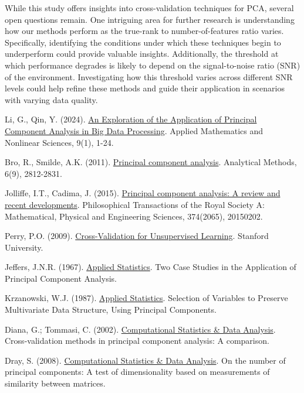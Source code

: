 \documentclass{article}
\begin{document}
While this study offers insights into cross-validation techniques for PCA, several open questions remain.
One intriguing area for further research is understanding how our methods perform as the true-rank to number-of-features ratio varies. 
Specifically, identifying the conditions under which these techniques begin to underperform could provide valuable insights. 
Additionally, the threshold at which performance degrades is likely to depend on the signal-to-noise ratio (SNR) of the environment. 
Investigating how this threshold varies across different SNR levels could help refine these methods and guide their application in scenarios with varying data quality.


\begin{thebibliography}{9}

   Li, G., Qin, Y. (2024).
   \href{https://doi.org/10.2478/amns-2024-0664}{An Exploration of the Application of Principal Component Analysis in Big Data Processing}.
   Applied Mathematics and Nonlinear Sciences, 9(1), 1-24.

   Bro, R., Smilde, A.K. (2011).
   \href{https://www.sciencedirect.com/science/article/pii/S0167947311004099}{Principal component analysis}.
   Analytical Methods, 6(9), 2812-2831.

   Jolliffe, I.T., Cadima, J. (2015).
   \href{https://www.sciencedirect.com/science/article/pii/S0169743915002579}{Principal component analysis: A review and recent developments}.
   Philosophical Transactions of the Royal Society A: Mathematical, Physical and Engineering Sciences, 374(2065), 20150202.
   
   Perry, P.O. (2009). 
   \href{https://citeseerx.ist.psu.edu/document?repid=rep1&type=pdf&doi=0a2508a9fd89513ddf1c227274c8192993520692}{Cross-Validation for Unsupervised Learning}. 
   Stanford University.

   Jeffers, J.N.R. (1967).
   \href{https://www.jstor.org/stable/2985919}{Applied Statistics}.
   Two Case Studies in the Application of Principal Component Analysis.

   Krzanowski, W.J. (1987).
   \href{https://www.tandfonline.com/doi/abs/10.1080/03610928708829385}{Applied Statistics}.
   Selection of Variables to Preserve Multivariate Data Structure, Using Principal Components.
   
   Diana, G.; Tommasi, C. (2002).
   \href{https://link.springer.com/article/10.1007/BF02511446}{Computational Statistics \& Data Analysis}.
   Cross-validation methods in principal component analysis: A comparison. 

   Dray, S. (2008).
   \href{https://www.sciencedirect.com/science/article/pii/S0167947307002939}{Computational Statistics \& Data Analysis}.
   On the number of principal components: A test of dimensionality based on measurements of similarity between matrices.


  

\end{thebibliography}
\end{document}
